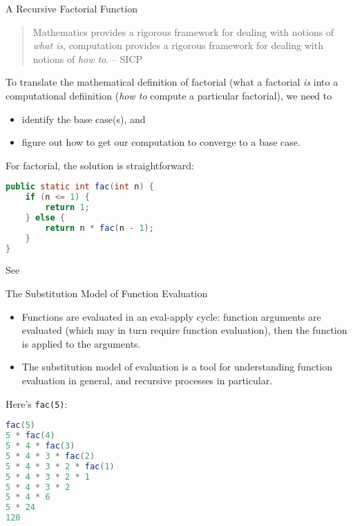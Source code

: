 \documentclass{beamer}
\begin{document}
\begin{frame}[fragile]{A Recursive Factorial Function}

\vspace{-.05in}
\begin{quote}
Mathematics provides a rigorous framework for dealing with notions of {\em what is}, computation provides a rigorous framework for dealing with notions of {\em how to}. -- SICP
\end{quote}
\vspace{-.05in}
To translate the mathematical definition of factorial (what a factorial {\it is} into a computational defiinition ({\it how to} compute a particular factorial), we need to
\begin{itemize}
\item identify the base case(s), and
\item figure out how to get our computation to converge to a base case.
\end{itemize}

For factorial, the solution is straightforward:
\begin{lstlisting}[language=Java]
public static int fac(int n) {
    if (n <= 1) {
        return 1;
    } else {
        return n * fac(n - 1);
    }
}
\end{lstlisting}
\vspace{-.05in}
See 

\end{frame}

\begin{frame}[fragile]{The Substitution Model of Function Evaluation}


\begin{itemize}
\item Functions are evaluated in an eval-apply cycle: function arguments are evaluated (which may in turn require function evaluation), then the function is applied to the arguments.
\item The substitution model of evaluation is a tool for understanding function evaluation in general, and recursive processes in particular.
\end{itemize}
Here's {\tt fac(5)}:
\vspace{-.05in}
\begin{lstlisting}[language=Java]
fac(5)
5 * fac(4)
5 * 4 * fac(3)
5 * 4 * 3 * fac(2)
5 * 4 * 3 * 2 * fac(1)
5 * 4 * 3 * 2 * 1
5 * 4 * 3 * 2
5 * 4 * 6
5 * 24
120
\end{lstlisting}


\end{frame}
\end{document}
